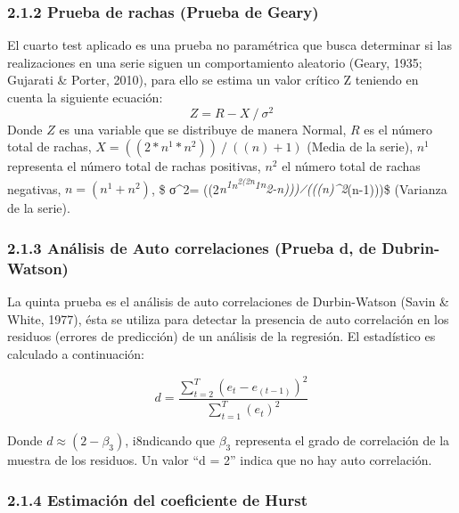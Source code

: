\documentclass[11pt]{article}
\begin{document}
    \hypertarget{prueba-de-rachas-prueba-de-geary}{%
\subsubsection{2.1.2 Prueba de rachas (Prueba de
Geary)}\label{prueba-de-rachas-prueba-de-geary}}

    El cuarto test aplicado es una prueba no paramétrica que busca
determinar si las realizaciones en una serie siguen un comportamiento
aleatorio (Geary, 1935; Gujarati \& Porter, 2010), para ello se estima
un valor crítico Z teniendo en cuenta la siguiente ecuación:
\begin{equation*}
Z= R-X⁄σ^2 
\end{equation*} Donde \(Z\) es una variable que se distribuye de manera
Normal, \(R\) es el número total de rachas,
\(X= ((2*n^1*n^2 ))⁄((n)+1)\) (Media de la serie), \(n^1\) representa el
número total de rachas positivas, \(n^2\) el número total de rachas
negativas, \(n= (n^1+n^2 )\), \$ σ\^{}2=
((2\emph{n\textsuperscript{1\emph{n\textsuperscript{2\emph{(2}n}1}n}2-n)))⁄(((n)\^{}2}(n-1)))\$
(Varianza de la serie).

    \hypertarget{anuxe1lisis-de-auto-correlaciones-prueba-d-de-dubrin-watson}{%
\subsubsection{2.1.3 Análisis de Auto correlaciones (Prueba d, de
Dubrin-Watson)}\label{anuxe1lisis-de-auto-correlaciones-prueba-d-de-dubrin-watson}}

    La quinta prueba es el análisis de auto correlaciones de Durbin-Watson
(Savin \& White, 1977), ésta se utiliza para detectar la presencia de
auto correlación en los residuos (errores de predicción) de un análisis
de la regresión. El estadístico es calculado a continuación:

\begin{equation*}
d=\frac{\sum_{t=2}^T (e_t-e_(t-1))^2}{\sum_{t=1}^T(e_t)^2}
\end{equation*}

Donde \(d≈(2- β_3)\), i8ndicando que \(β_3\) representa el grado de
correlación de la muestra de los residuos. Un valor ``d = 2'' indica que
no hay auto correlación.

    \hypertarget{estimaciuxf3n-del-coeficiente-de-hurst}{%
\subsubsection{2.1.4 Estimación del coeficiente de
Hurst}\label{estimaciuxf3n-del-coeficiente-de-hurst}}
\end{document}
